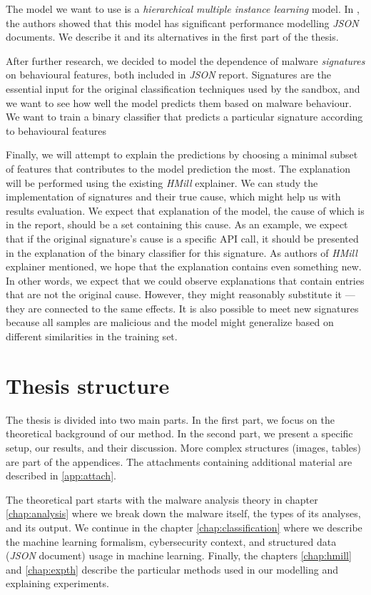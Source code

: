The model we want to use is a \emph{hierarchical multiple instance learning} model. In \cite{Mandlik2020}, the authors showed that this model has significant performance modelling \emph{JSON} documents. We describe it and its alternatives in the first part of the thesis. 

After further research, we decided to model the dependence of malware \emph{signatures} on behavioural features, both included in \emph{JSON} report. Signatures are the essential input for the original classification techniques used by the sandbox, and we want to see how well the model predicts them based on malware behaviour. We want to train a binary classifier that predicts a particular signature according to behavioural features

Finally, we will attempt to explain the predictions by choosing a minimal subset of features that contributes to the model prediction the most. The explanation will be performed using the existing \emph{HMill} explainer. We can study the implementation of signatures and their true cause, which might help us with results evaluation. We expect that explanation of the model, the cause of which is in the report, should be a set containing this cause. As an example, we expect that if the original signature's cause is a specific API call, it should be presented in the explanation of the binary classifier for this signature. As authors of \emph{HMill} explainer mentioned, we hope that the explanation contains even something new. In other words, we expect that we could observe explanations that contain entries that are not the original cause. However, they might reasonably substitute it --- they are connected to the same effects. It is also possible to meet new signatures because all samples are malicious and the model might generalize based on different similarities in the training set.

\section*{Thesis structure}
The thesis is divided into two main parts. In the first part, we focus on the theoretical background of our method. In the second part, we present a specific setup, our results, and their discussion. More complex structures (images, tables) are part of the appendices. The attachments containing additional material are described in \ref{app:attach}.

The theoretical part starts with the malware analysis theory in chapter \ref{chap:analysis} where we break down the malware itself, the types of its analyses, and its output. We continue in the chapter \ref{chap:classification} where we describe the machine learning formalism, cybersecurity context, and structured data (\emph{JSON} document) usage in machine learning. Finally, the chapters \ref{chap:hmill} and \ref{chap:expth} describe the particular methods used in our modelling and explaining experiments.


